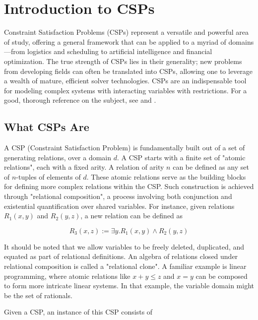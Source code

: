 \section{Introduction to CSPs}\label{sec:intro}

Constraint Satisfaction Problems (CSPs) represent a versatile and powerful area of study, offering a general framework that can be applied to a myriad of domains—from logistics and scheduling to artificial intelligence and financial optimization. The true strength of CSPs lies in their generality; new problems from developing fields can often be translated into CSPs, allowing one to leverage a wealth of mature, efficient solver technologies. CSPs are an indispensable tool for modeling complex systems with interacting variables with restrictions. For a good, thorough reference on the subject, see \citep{rossi2006handbook} and \citep{tsang1993foundations}.

\subsection{What CSPs Are}\label{sec:csp-def}

A CSP (Constraint Satisfaction Problem) is fundamentally built out of a set of generating relations, over a domain $d$. A CSP starts with a finite set of "atomic relations", each with a fixed arity. A relation of arity $n$ can be defined as any set of $n$-tuples of elements of $d$. These atomic relations serve as the building blocks for defining more complex relations within the CSP. Such construction is achieved through "relational composition", a process involving both conjunction and existential quantification over shared variables. For instance, given relations $R_1(x,y)$ and $R_2(y,z)$, a new relation can be defined as

\begin{equation}\label{equation:relation-composition-example}
R_3(x,z) := \exists y. R_1(x,y) \wedge R_2(y,z)
\end{equation}

It should be noted that we allow variables to be freely deleted, duplicated, and equated as part of relational definitions. An algebra of relations closed under relational composition is called a "relational clone". A familiar example is linear programming, where atomic relations like $x+y\leq z$ and $x=y$ can be composed to form more intricate linear systems. In that example, the variable domain might be the set of rationals.

Given a CSP, an instance of this CSP consists of

